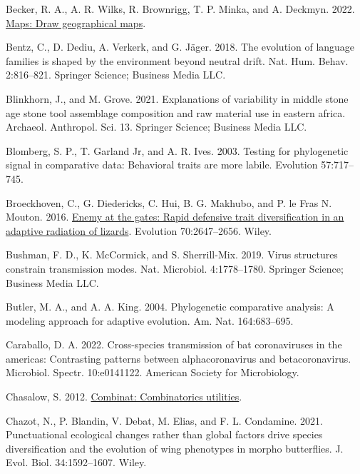 \documentclass[fleqn,10pt,lineno]{wlpeerj} %
\newlength{\cslhangindent}
\newlength{\cslentryspacingunit} %
\newenvironment{CSLReferences}[2] %
 {%
  \setlength{\parindent}{0pt}
  \ifodd #1
  \let\oldpar\par
  \def\par{\hangindent=\cslhangindent\oldpar}
  \fi
  \setlength{\parskip}{#2\cslentryspacingunit}
 }%
 {}
\begin{document}
\begin{CSLReferences}{1}{0}
\leavevmode{}%
Becker, R. A., A. R. Wilks, R. Brownrigg, T. P. Minka, and A. Deckmyn. 2022. \href{https://CRAN.R-project.org/package=maps}{Maps: Draw geographical maps}.

\leavevmode{}%
Bentz, C., D. Dediu, A. Verkerk, and G. Jäger. 2018. The evolution of language families is shaped by the environment beyond neutral drift. Nat. Hum. Behav. 2:816--821. Springer Science; Business Media LLC.

\leavevmode{}%
Blinkhorn, J., and M. Grove. 2021. Explanations of variability in middle stone age stone tool assemblage composition and raw material use in eastern africa. Archaeol. Anthropol. Sci. 13. Springer Science; Business Media LLC.

\leavevmode{}%
Blomberg, S. P., T. Garland Jr, and A. R. Ives. 2003. Testing for phylogenetic signal in comparative data: Behavioral traits are more labile. Evolution 57:717--745.

\leavevmode{}%
Broeckhoven, C., G. Diedericks, C. Hui, B. G. Makhubo, and P. le Fras N. Mouton. 2016. \href{https://doi.org/10.1111/evo.13062}{Enemy at the gates: Rapid defensive trait diversification in an adaptive radiation of lizards}. Evolution 70:2647--2656. Wiley.

\leavevmode{}%
Bushman, F. D., K. McCormick, and S. Sherrill-Mix. 2019. Virus structures constrain transmission modes. Nat. Microbiol. 4:1778--1780. Springer Science; Business Media LLC.

\leavevmode{}%
Butler, M. A., and A. A. King. 2004. Phylogenetic comparative analysis: A modeling approach for adaptive evolution. Am. Nat. 164:683--695.

\leavevmode{}%
Caraballo, D. A. 2022. Cross-species transmission of bat coronaviruses in the americas: Contrasting patterns between alphacoronavirus and betacoronavirus. Microbiol. Spectr. 10:e0141122. American Society for Microbiology.

\leavevmode{}%
Chasalow, S. 2012. \href{https://CRAN.R-project.org/package=combinat}{Combinat: Combinatorics utilities}.

\leavevmode{}%
Chazot, N., P. Blandin, V. Debat, M. Elias, and F. L. Condamine. 2021. Punctuational ecological changes rather than global factors drive species diversification and the evolution of wing phenotypes in morpho butterflies. J. Evol. Biol. 34:1592--1607. Wiley.


\end{CSLReferences}
\end{document}
